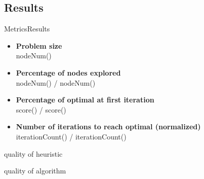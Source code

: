 \subsection{Results}

\begin{frame}{Metrics}{Results}

\begin{itemize}
\item \textcolor{metric-PR}{\textbf{Problem size}} \\
nodeNum() 
\bigskip
\item \textcolor{metric-NE}{\textbf{Percentage of nodes explored}}
\\
nodeNum() / nodeNum()
\bigskip
\item \textcolor{metric-OFI}{\textbf{Percentage of optimal at first iteration}}
\\
score() / score()
\bigskip
\item \textcolor{metric-IRO}{\textbf{Number of iterations to reach optimal (normalized)}}
\\
iterationCount() / iterationCount()
\end{itemize}

\end{frame}

\begin{frame}

quality of heuristic


quality of algorithm

\end{frame}

